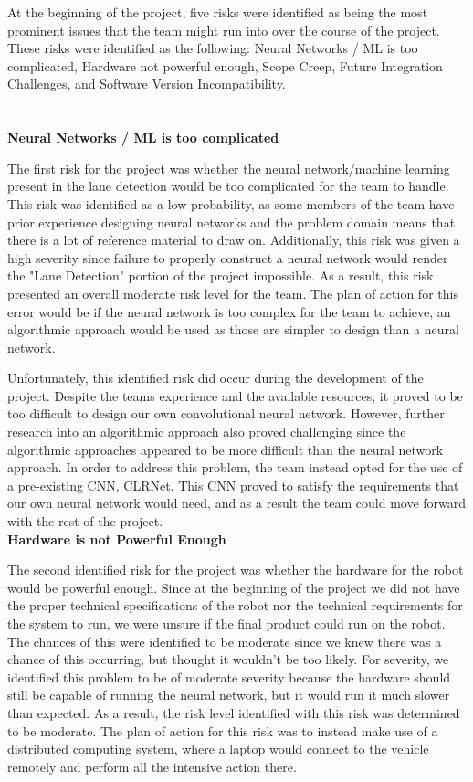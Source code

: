 \documentclass[titlepage, draft]{article}
\begin{document}
At the beginning of the project, five risks were identified as being the most prominent issues that the team might run into over the course of the project. These risks were identified as the following: Neural Networks / ML is too complicated, Hardware not powerful enough, Scope Creep, Future Integration Challenges, and Software Version Incompatibility.
\\
\\
\\

\textbf{Neural Networks / ML is too complicated}

The first risk for the project was whether the neural network/machine learning present in the lane detection would be too complicated for the team to handle. This risk was identified as a low probability, as some members of the team have prior experience designing neural networks and the problem domain means that there is a lot of reference material to draw on. Additionally, this risk was given a high severity since failure to properly construct a neural network would render the "Lane Detection" portion of the project impossible. As a result, this risk presented an overall moderate risk level for the team. The plan of action for this error would be if the neural network is too complex for the team to achieve, an algorithmic approach would be used as those are simpler to design than a neural network.

Unfortunately, this identified risk did occur during the development of the project. Despite the teams experience and the available resources, it proved to be too difficult to design our own convolutional neural network. However, further research into an algorithmic approach also proved challenging since the algorithmic approaches appeared to be more difficult than the neural network approach. In order to address this problem, the team instead opted for the use of a pre-existing CNN, CLRNet. This CNN proved to satisfy the requirements that our own neural network would need, and as a result the team could move forward with the rest of the project.
\\

\textbf{Hardware is not Powerful Enough}

The second identified risk for the project was whether the hardware for the robot would be powerful enough. Since at the beginning of the project we did not have the proper technical specifications of the robot nor the technical requirements for the system to run, we were unsure if the final product could run on the robot. The chances of this were identified to be moderate since we knew there was a chance of this occurring, but thought it wouldn't be too likely. For severity, we identified this problem to be of moderate severity because the hardware should still be capable of running the neural network, but it would run it much slower than expected. As a result, the risk level identified with this risk was determined to be moderate. The plan of action for this risk was to instead make use of a distributed computing system, where a laptop would connect to the vehicle remotely and perform all the intensive action there.
\end{document}

